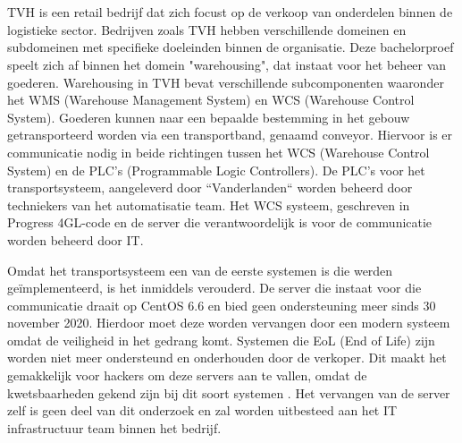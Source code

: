 
\chapter{}%
\label{ch:inleiding}


TVH is een retail bedrijf dat zich focust op de verkoop van onderdelen binnen de logistieke sector. 
Bedrijven zoals TVH hebben verschillende domeinen en subdomeinen met specifieke doeleinden binnen de organisatie. 
Deze bachelorproef speelt zich af binnen het domein "warehousing", dat instaat voor het beheer van goederen.
Warehousing in TVH bevat verschillende subcomponenten waaronder het WMS (Warehouse Management System) en WCS (Warehouse Control System).
Goederen kunnen naar een bepaalde bestemming in het gebouw getransporteerd worden via een transportband, genaamd conveyor.
Hiervoor is er communicatie nodig in beide richtingen tussen het WCS (Warehouse Control System) en de PLC's (Programmable Logic Controllers).
De PLC's voor het transportsysteem, aangeleverd door ``Vanderlanden`` worden beheerd door techniekers van het automatisatie team.
Het WCS systeem, geschreven in Progress 4GL-code en de server die verantwoordelijk is voor de communicatie worden beheerd door IT.
\newline
 
Omdat het transportsysteem een van de eerste systemen is die werden geïmplementeerd, is het inmiddels verouderd. 
De server die instaat voor die communicatie draait op CentOS 6.6 en bied geen ondersteuning meer sinds 30 november 2020.
Hierdoor moet deze worden vervangen door een modern systeem omdat de veiligheid in het gedrang komt.
Systemen die EoL (End of Life) zijn worden niet meer ondersteund en onderhouden door de verkoper. 
Dit maakt het gemakkelijk voor hackers om deze servers aan te vallen, omdat de kwetsbaarheden gekend zijn bij dit soort systemen \autocite{Mittal2024}.
Het vervangen van de server zelf is geen deel van dit onderzoek en zal worden uitbesteed aan het IT infrastructuur team binnen het bedrijf.
\newline
 

